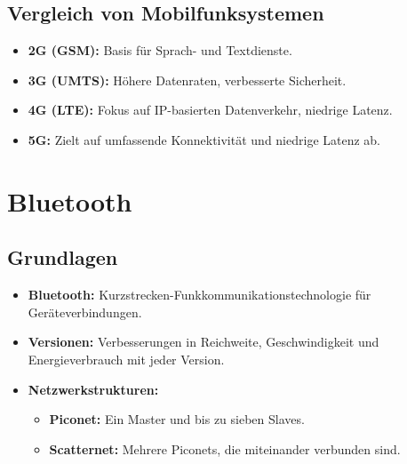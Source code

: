 \documentclass{article}
\begin{document}
\subsection{Vergleich von Mobilfunksystemen}
\begin{itemize}
    \item \textbf{2G (GSM):} Basis für Sprach- und Textdienste.
    \item \textbf{3G (UMTS):} Höhere Datenraten, verbesserte Sicherheit.
    \item \textbf{4G (LTE):} Fokus auf IP-basierten Datenverkehr, niedrige Latenz.
    \item \textbf{5G:} Zielt auf umfassende Konnektivität und niedrige Latenz ab.
\end{itemize}


\section{Bluetooth}

\subsection{Grundlagen}
\begin{itemize}
    \item \textbf{Bluetooth:} Kurzstrecken-Funkkommunikationstechnologie für Geräteverbindungen.
    \item \textbf{Versionen:} Verbesserungen in Reichweite, Geschwindigkeit und Energieverbrauch mit jeder Version.
    \item \textbf{Netzwerkstrukturen:}
    \begin{itemize}
        \item \textbf{Piconet:} Ein Master und bis zu sieben Slaves.
        \item \textbf{Scatternet:} Mehrere Piconets, die miteinander verbunden sind.
    \end{itemize}
\end{itemize}
\end{document}

